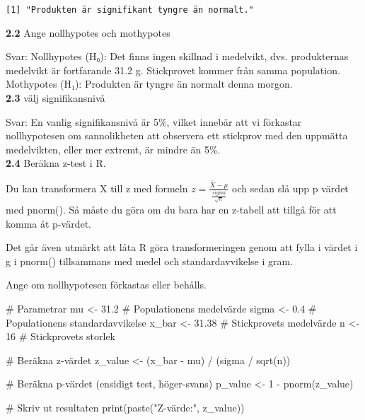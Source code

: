 \documentclass[
  letterpaper,
  DIV=11,
  numbers=noendperiod]{scrartcl}
\newenvironment{Shaded}{\begin{snugshade}}{\end{snugshade}}
\newcommand{\CommentTok}[1]{\textcolor[rgb]{0.37,0.37,0.37}{#1}}
\newcommand{\DecValTok}[1]{\textcolor[rgb]{0.68,0.00,0.00}{#1}}
\newcommand{\FloatTok}[1]{\textcolor[rgb]{0.68,0.00,0.00}{#1}}
\newcommand{\FunctionTok}[1]{\textcolor[rgb]{0.28,0.35,0.67}{#1}}
\newcommand{\NormalTok}[1]{\textcolor[rgb]{0.00,0.23,0.31}{#1}}
\newcommand{\OtherTok}[1]{\textcolor[rgb]{0.00,0.23,0.31}{#1}}
\newcommand{\SpecialCharTok}[1]{\textcolor[rgb]{0.37,0.37,0.37}{#1}}
\newcommand{\StringTok}[1]{\textcolor[rgb]{0.13,0.47,0.30}{#1}}
\begin{document}
\begin{verbatim}
[1] "Produkten är signifikant tyngre än normalt."
\end{verbatim}

\textbf{2.2} Ange nollhypotes och mothypotes

\hfill\break
Svar: Nollhypotes (H₀): Det finns ingen skillnad i medelvikt, dvs.
produkternas medelvikt är fortfarande 31.2 g. Stickprovet kommer från
samma population. Mothypotes (H₁): Produkten är tyngre än normalt denna
morgon.\\

\textbf{2.3} välj signifikansnivå

\hfill\break
Svar: En vanlig signifikansnivå är 5\%, vilket innebär att vi förkastar
nollhypotesen om sannolikheten att observera ett stickprov med den
uppmätta medelvikten, eller mer extremt, är mindre än 5\%.\\

\textbf{2.4} Beräkna z-test i R.

Du kan transformera X till z med formeln
\(z = \frac{\bar{X} - \mu}{\frac{sigma}{\sqrt{n}}}\) och sedan slå upp p
värdet med pnorm(). Så måste du göra om du bara har en z-tabell att
tillgå för att komma åt p-värdet.

Det går även utmärkt att låta R göra transformeringen genom att fylla i
värdet i g i pnorm() tillsammans med medel och standardavvikelse i gram.

Ange om nollhypotesen förkastas eller behålls.

\begin{Shaded}
\begin{Highlighting}[]
\CommentTok{\# Parametrar}
\NormalTok{mu }\OtherTok{\textless{}{-}} \FloatTok{31.2}          \CommentTok{\# Populationens medelvärde}
\NormalTok{sigma }\OtherTok{\textless{}{-}} \FloatTok{0.4}        \CommentTok{\# Populationens standardavvikelse}
\NormalTok{x\_bar }\OtherTok{\textless{}{-}} \FloatTok{31.38}      \CommentTok{\# Stickprovets medelvärde}
\NormalTok{n }\OtherTok{\textless{}{-}} \DecValTok{16}             \CommentTok{\# Stickprovets storlek}

\CommentTok{\# Beräkna z{-}värdet}
\NormalTok{z\_value }\OtherTok{\textless{}{-}}\NormalTok{ (x\_bar }\SpecialCharTok{{-}}\NormalTok{ mu) }\SpecialCharTok{/}\NormalTok{ (sigma }\SpecialCharTok{/} \FunctionTok{sqrt}\NormalTok{(n))}

\CommentTok{\# Beräkna p{-}värdet (ensidigt test, höger{-}svans)}
\NormalTok{p\_value }\OtherTok{\textless{}{-}} \DecValTok{1} \SpecialCharTok{{-}} \FunctionTok{pnorm}\NormalTok{(z\_value)}

\CommentTok{\# Skriv ut resultaten}
\FunctionTok{print}\NormalTok{(}\FunctionTok{paste}\NormalTok{(}\StringTok{"Z{-}värde:"}\NormalTok{, z\_value))}
\end{Highlighting}
\end{Shaded}
\end{document}
